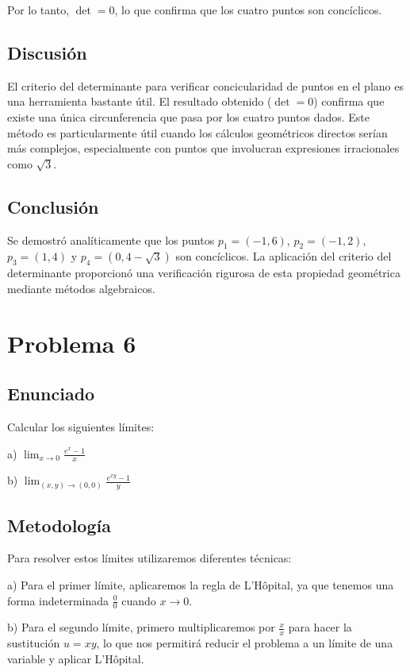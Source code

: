 \documentclass{article}
\begin{document}
Por lo tanto, $\det = 0$, lo que confirma que los cuatro puntos son concíclicos.

\subsection{Discusión}
El criterio del determinante para verificar concicularidad de puntos en el plano es una herramienta bastante útil. El resultado obtenido ($\det = 0$) confirma que existe una única circunferencia que pasa por los cuatro puntos dados. Este método es particularmente útil cuando los cálculos geométricos directos serían más complejos, especialmente con puntos que involucran expresiones irracionales como $\sqrt{3}$.

\subsection{Conclusión}
Se demostró analíticamente que los puntos $p_1 = (-1, 6)$, $p_2 = (-1, 2)$, $p_3 = (1, 4)$ y $p_4 = (0, 4 - \sqrt{3})$ son concíclicos. La aplicación del criterio del determinante proporcionó una verificación rigurosa de esta propiedad geométrica mediante métodos algebraicos.

\section{Problema 6}

\subsection{Enunciado}
Calcular los siguientes límites:

a) $\lim_{x \to 0} \frac{e^x - 1}{x}$

b) $\lim_{(x,y) \to (0,0)} \frac{e^{xy} - 1}{y}$

\subsection{Metodología}

Para resolver estos límites utilizaremos diferentes técnicas:

a) Para el primer límite, aplicaremos la regla de L'Hôpital, ya que tenemos una forma indeterminada $\frac{0}{0}$ cuando $x \to 0$.

b) Para el segundo límite, primero multiplicaremos por $\frac{x}{x}$ para hacer la sustitución $u = xy$, lo que nos permitirá reducir el problema a un límite de una variable y aplicar L'Hôpital.
\end{document}

